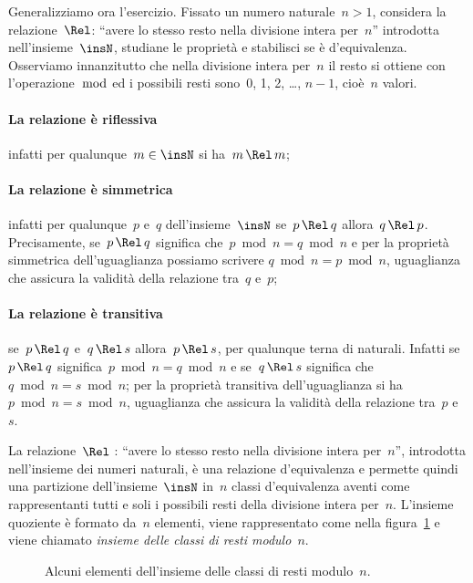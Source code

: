 Generalizziamo ora l'esercizio.
Fissato un numero naturale~$n>1$, considera la relazione~$\Rel$: ``avere lo stesso resto nella divisione intera per~$n$''
introdotta nell'insieme~$\insN$, studiane le proprietà e stabilisci se è d'equivalenza.
Osserviamo innanzitutto che nella divisione intera per~$n$ il resto si ottiene con l'operazione~$\bmod$ ed i possibili resti sono~0, 1, 2, \ldots, $n-1$,
cioè~$n$ valori.

\paragraph{La relazione è riflessiva} infatti per qualunque~$m\in \insN$ si ha~$m\,\Rel\, m$;
\paragraph{La relazione è simmetrica} infatti per qualunque~$p$ e~$q$ dell'insieme~$\insN$ se~$p\,\Rel\, q$ allora~$q\,\Rel\, p$.
Precisamente, se~$p\,\Rel\, q$ significa che~$p\bmod n=q\bmod n$ e per la proprietà simmetrica dell'uguaglianza possiamo scrivere
$q\bmod n=p\bmod n$, uguaglianza che assicura la validità della relazione tra~$q$ e~$p$;
\paragraph{La relazione è transitiva} se~$p\,\Rel\, q$ e~$q\,\Rel\, s$ allora~$p\,\Rel\, s$, per qualunque terna di naturali.
Infatti se~$p\,\Rel\, q$ significa~$p\bmod n=q\bmod n$ e se~$q\,\Rel\, s$ significa che~$q\bmod n=s\bmod n$;
per la proprietà transitiva dell'uguaglianza si ha~$p\bmod n=s\bmod n$, uguaglianza che assicura la validità della relazione tra~$p$ e~$s$.


\conclusione La relazione~$\Rel~$: ``avere lo stesso resto nella divisione intera per~$n$'', introdotta nell'insieme dei
numeri naturali, è una relazione d'equivalenza e permette quindi una partizione dell'insieme~$\insN$ in~$n$ classi d'equivalenza aventi
come rappresentanti tutti e soli i possibili resti della divisione intera per~$n$. L'insieme quoziente è formato da~$n$ elementi,
viene rappresentato come nella figura~\ref{fig:E.8} e viene chiamato \emph{insieme delle classi di resti modulo~$n$}.

\begin{figure}[b]
 \centering
 \caption{Alcuni elementi dell'insieme delle classi di resti modulo~$n$.}\label{fig:E.8}
\end{figure}

